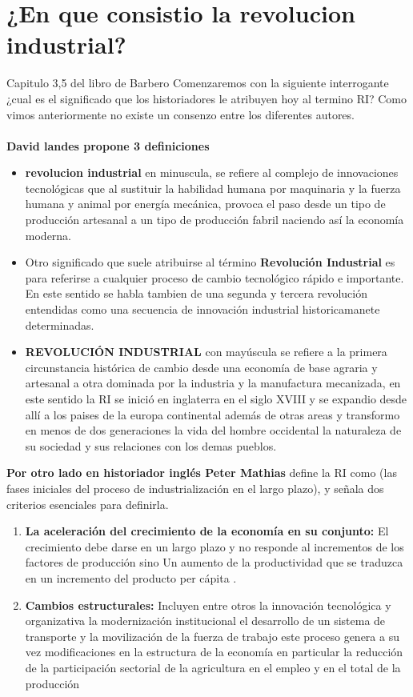 \documentclass[12pt]{book}
\begin{document}
\section{¿En que consistio la revolucion industrial?}
Capitulo 3,5 del libro de Barbero
 Comenzaremos con la siguiente interrogante ¿cual es el significado que los historiadores le atribuyen hoy al termino RI? Como vimos anteriormente no existe un consenzo entre los diferentes autores.
 \\
\\
\textbf{David landes propone 3 definiciones}
\begin{itemize}
 \item \textbf{revolucion industrial} en minuscula, se refiere al complejo de innovaciones tecnol\'ogicas que al sustituir la habilidad humana por maquinaria y la fuerza humana y animal por energ\'ia mec\'anica, provoca el paso desde un tipo de producci\'on artesanal a un tipo de producci\'on fabril naciendo as\'i la econom\'ia moderna.
 \item Otro significado que suele atribuirse al t\'ermino \textbf{Revoluci\'on Industrial}  es para referirse a cualquier proceso de cambio tecnol\'ogico r\'apido e importante.	En este sentido se habla tambien de una segunda y tercera revoluci\'on entendidas como una secuencia de innovaci\'on industrial historicamanete determinadas.
 \item \textbf{REVOLUCI\'ON INDUSTRIAL} con may\'uscula se refiere a la primera circunstancia hist\'orica de cambio desde una econom\'ia de base agraria y artesanal a otra dominada por la industria y la manufactura mecanizada, en este sentido la RI se inici\'o en inglaterra en el siglo XVIII y se expandio desde all\'i a los paises de la europa continental adem\'as de otras areas y transformo en menos de dos generaciones la vida del hombre occidental la naturaleza de su sociedad y sus relaciones con los demas pueblos.
 \end{itemize} 
\textbf{Por otro lado en historiador ingl\'es Peter Mathias} define la RI como (las fases iniciales del proceso de industrializaci\'on en el largo plazo), y señala dos criterios esenciales para definirla.
\begin{enumerate}
\item \textbf{La aceleraci\'on del crecimiento de la econom\'ia en su conjunto: }El crecimiento debe darse en un largo plazo y no responde al incrementos de los factores de producción sino Un aumento de la productividad que se traduzca en un incremento del producto per cápita .
\item \textbf{Cambios estructurales: }Incluyen entre otros la innovación tecnológica y organizativa la modernización institucional el desarrollo de un sistema de transporte y la movilización de la fuerza de trabajo este proceso genera a su vez modificaciones en la estructura de la economía en particular la reducción de la participación sectorial de la agricultura en el empleo y en el total de la producción
\end{enumerate}
\end{document}
